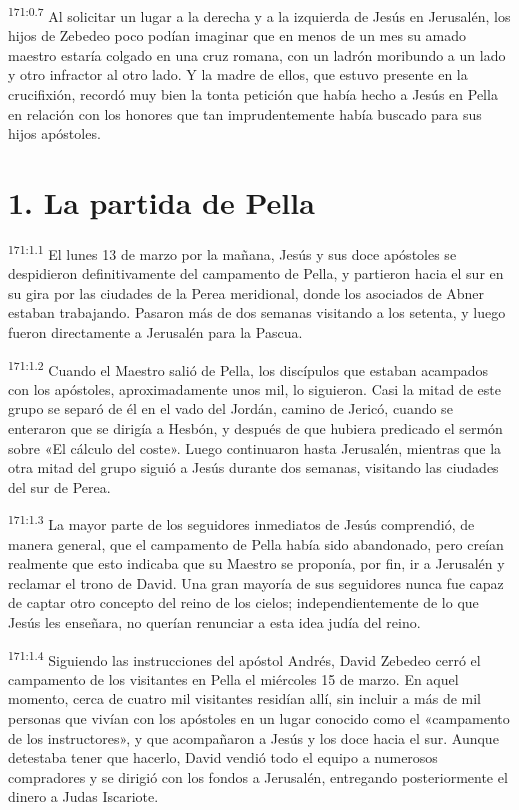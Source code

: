 \par 
\textsuperscript{171:0.7} Al solicitar un lugar a la derecha y a la izquierda de Jesús en Jerusalén, los hijos de Zebedeo poco podían imaginar que en menos de un mes su amado maestro estaría colgado en una cruz romana, con un ladrón moribundo a un lado y otro infractor al otro lado. Y la madre de ellos, que estuvo presente en la crucifixión, recordó muy bien la tonta petición que había hecho a Jesús en Pella en relación con los honores que tan imprudentemente había buscado para sus hijos apóstoles.

\section*{1. La partida de Pella}
\par 
\textsuperscript{171:1.1} El lunes 13 de marzo por la mañana, Jesús y sus doce apóstoles se despidieron definitivamente del campamento de Pella, y partieron hacia el sur en su gira por las ciudades de la Perea meridional, donde los asociados de Abner estaban trabajando. Pasaron más de dos semanas visitando a los setenta, y luego fueron directamente a Jerusalén para la Pascua.

\par 
\textsuperscript{171:1.2} Cuando el Maestro salió de Pella, los discípulos que estaban acampados con los apóstoles, aproximadamente unos mil, lo siguieron. Casi la mitad de este grupo se separó de él en el vado del Jordán, camino de Jericó, cuando se enteraron que se dirigía a Hesbón, y después de que hubiera predicado el sermón sobre «El cálculo del coste». Luego continuaron hasta Jerusalén, mientras que la otra mitad del grupo siguió a Jesús durante dos semanas, visitando las ciudades del sur de Perea.

\par 
\textsuperscript{171:1.3} La mayor parte de los seguidores inmediatos de Jesús comprendió, de manera general, que el campamento de Pella había sido abandonado, pero creían realmente que esto indicaba que su Maestro se proponía, por fin, ir a Jerusalén y reclamar el trono de David. Una gran mayoría de sus seguidores nunca fue capaz de captar otro concepto del reino de los cielos; independientemente de lo que Jesús les enseñara, no querían renunciar a esta idea judía del reino.

\par 
\textsuperscript{171:1.4} Siguiendo las instrucciones del apóstol Andrés, David Zebedeo cerró el campamento de los visitantes en Pella el miércoles 15 de marzo. En aquel momento, cerca de cuatro mil visitantes residían allí, sin incluir a más de mil personas que vivían con los apóstoles en un lugar conocido como el «campamento de los instructores», y que acompañaron a Jesús y los doce hacia el sur. Aunque detestaba tener que hacerlo, David vendió todo el equipo a numerosos compradores y se dirigió con los fondos a Jerusalén, entregando posteriormente el dinero a Judas Iscariote.

